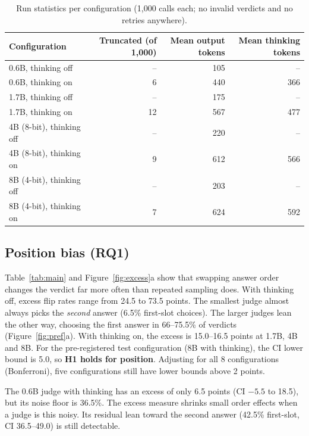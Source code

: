 \documentclass[10pt]{article}
\begin{document}
\begin{table}[H]
\centering\small
\caption{Run statistics per configuration (1{,}000 calls each; no invalid verdicts and no retries anywhere).}
\label{tab:runs}
\begin{tabular}{lrrr}
\toprule
Configuration & Truncated (of 1{,}000) & Mean output tokens & Mean thinking tokens \\
\midrule
0.6B, thinking off & -- & 105 & -- \\
0.6B, thinking on & 6 & 440 & 366 \\
1.7B, thinking off & -- & 175 & -- \\
1.7B, thinking on & 12 & 567 & 477 \\
4B (8-bit), thinking off & -- & 220 & -- \\
4B (8-bit), thinking on & 9 & 612 & 566 \\
8B (4-bit), thinking off & -- & 203 & -- \\
8B (4-bit), thinking on & 7 & 624 & 592 \\
\bottomrule
\end{tabular}
\end{table}

\subsection{Position bias (RQ1)}
Table~\ref{tab:main} and Figure~\ref{fig:excess}a show that swapping answer order changes the verdict far more
often than repeated sampling does. With thinking off, excess flip rates range from 24.5 to 73.5 points. The
smallest judge almost always picks the \emph{second} answer (6.5\% first-slot choices). The larger judges lean the
other way, choosing the first answer in 66--75.5\% of verdicts (Figure~\ref{fig:pref}a). With thinking on, the
excess is 15.0--16.5 points at 1.7B, 4B and 8B. For the pre-registered test configuration (8B with thinking), the
CI lower bound is 5.0, so \textbf{H1 holds for position}. Adjusting for all 8 configurations (Bonferroni), five
configurations still have lower bounds above 2 points.

The 0.6B judge with thinking has an excess of only 6.5 points (CI $-5.5$ to 18.5), but its noise floor is
36.5\%. The excess measure shrinks small order effects when a judge is this noisy. Its residual lean toward the
second answer (42.5\% first-slot, CI 36.5--49.0) is still detectable.
\end{document}
